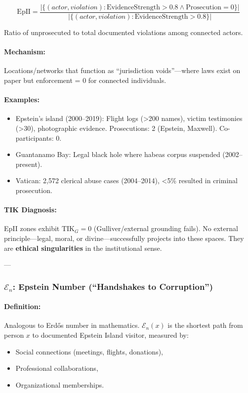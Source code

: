 \documentclass[11pt,a4paper]{article}
\theoremstyle{definition}
\theoremstyle{remark}
\begin{document}
\[
\text{EpII} = \frac{|\{(actor, violation) : \text{EvidenceStrength} > 0.8 \land \text{Prosecution} = 0\}|}{|\{(actor, violation) : \text{EvidenceStrength} > 0.8\}|}
\]

Ratio of unprosecuted to total documented violations among connected actors.

\paragraph{Mechanism:}
Locations/networks that function as ``jurisdiction voids''—where laws exist on paper but enforcement = 0 for connected individuals.

\paragraph{Examples:}
\begin{itemize}
\item Epstein's island (2000–2019): Flight logs (>200 names), victim testimonies (>30), photographic evidence. Prosecutions: 2 (Epstein, Maxwell). Co-participants: 0.
\item Guantanamo Bay: Legal black hole where habeas corpus suspended (2002–present).
\item Vatican: 2,572 clerical abuse cases (2004–2014), <5\% resulted in criminal prosecution.
\end{itemize}

\paragraph{TIK Diagnosis:}
EpII zones exhibit $\text{TIK}_G = 0$ (Gulliver/external grounding fails). No external principle—legal, moral, or divine—successfully projects into these spaces. They are \textbf{ethical singularities} in the institutional sense.

---

\subsubsection{$\mathcal{E}_n$: Epstein Number (``Handshakes to Corruption'')}

\paragraph{Definition:}
Analogous to Erdős number in mathematics. $\mathcal{E}_n(x)$ is the shortest path from person $x$ to documented Epstein Island visitor, measured by:
\begin{itemize}
\item Social connections (meetings, flights, donations),
\item Professional collaborations,
\item Organizational memberships.
\end{itemize}
\end{document}
